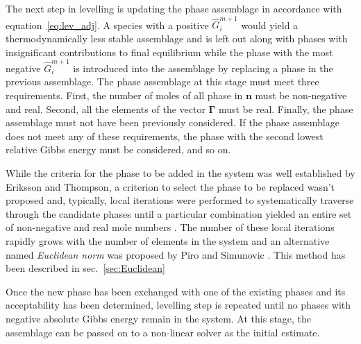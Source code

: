 	The next step in levelling is updating the phase assemblage in accordance with equation~\eqref{eq:lev_adj}. A  species with a positive $\hat{G}_i^{m+1}$ would yield a thermodynamically less stable assemblage and is left out along with phases with insignificant contributions to final equilibrium while the phase with the most negative $\hat{G}_i^{m+1}$ is introduced into the assemblage by replacing a phase in the previous assemblage. The phase assemblage at this stage must meet three requirements. First, the number of moles of all phase in $\mathbf{n}$ must be non-negative and real. Second, all the elements of the vector $\boldsymbol{\Gamma}$ must be real. Finally, the phase assemblage must not have been previously considered. If the phase assemblage does not meet any of these requirements, the phase with the second lowest relative Gibbs energy must be considered, and so on. 

	While the criteria for the phase to be added in the system was well established by Eriksson and Thompson, a criterion to select the phase to be replaced wasn't proposed and, typically, local iterations were performed to systematically traverse through the candidate phases until a particular combination yielded an entire set of non-negative and real mole numbers \cite{Eriksson89}. The number of these local iterations rapidly grows with the number of elements in the system and an alternative named \emph{Euclidean norm} was proposed by Piro and Simunovic \cite{Piro12a}. This method has been described in sec.~\ref{sec:Euclidean}

	Once the new phase has been exchanged with one of the existing phases and its acceptability has been determined, levelling step is repeated until no phases with negative absolute Gibbs energy remain in the system. At this stage, the assemblage can be passed on to a non-linear solver as the initial estimate. 
		
